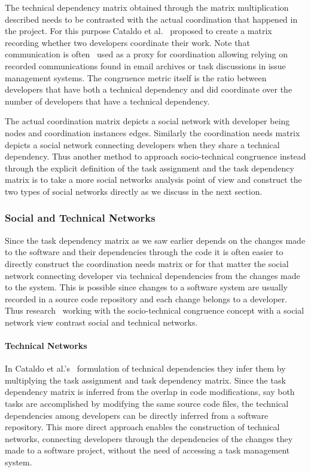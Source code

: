 The technical dependency matrix obtained through the matrix multiplication described needs to be contrasted with the actual coordination that happened in the project.
For this purpose Cataldo et al.~\cite{cataldo:cscw:2006} proposed to create a matrix recording whether two developers coordinate their work.
Note that communication is often~\cite{cataldo:cscw:2006,kwan:tse:2011,valetto:msr:2007,ducheneaut:cscw:2005,ehrlich:stc:2008,wolf:icse:2009} used as a proxy for coordination allowing relying on recorded communications found in email archives or task discussions in issue management systems.
The congruence metric itself is the ratio between developers that have both a technical dependency and did coordinate over the number of developers that have a technical dependency.

The actual coordination matrix depicts a social network with developer being nodes and coordination instances edges.
Similarly the coordination needs matrix depicts a social network connecting developers when they share a technical dependency.
Thus another method to approach socio-technical congruence instead through the explicit definition of the task assignment and the task dependency matrix is to take a more social networks analysis point of view and construct the two types of social networks directly as we discuss in the next section.

\subsubsection{Social and Technical Networks}
Since the task dependency matrix as we saw earlier depends on the changes made to the software and their dependencies through the code it is often easier to directly construct the coordination needs matrix or for that matter the social network connecting developer via technical dependencies from the changes made to the system.
This is possible since changes to a software system are usually recorded in a source code repository and each change belongs to a developer.
Thus research~\cite{cataldo:cscw:2006,kwan:tse:2011,valetto:msr:2007,ducheneaut:cscw:2005,ehrlich:stc:2008} working with the socio-technical congruence concept with a social network view contrast social and technical networks.

\paragraph{Technical Networks}
In Cataldo et al.'s~\cite{cataldo:cscw:2006} formulation of technical dependencies they infer them by multiplying the task assignment and task dependency matrix.
Since the task dependency matrix is inferred from the overlap in code modifications, say both tasks are accomplished by modifying the same source code files, the technical dependencies among developers can be directly inferred from a software repository.
This more direct approach enables the construction of technical networks, connecting developers through the dependencies of the changes they made to a software project, without the need of accessing a task management system.

